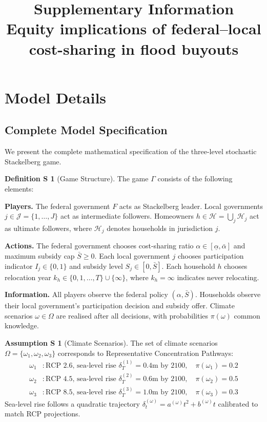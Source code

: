 \documentclass[11pt,letterpaper]{article}
\title{\Large\textbf{Supplementary Information}\\[0.5em]
\large Equity implications of federal--local cost-sharing in flood buyouts}
\author{}
\date{}
\theoremstyle{definition}
\newtheorem{definitionS}{Definition S}
\newtheorem{assumptionS}{Assumption S}
\begin{document}
\maketitle

\tableofcontents
\clearpage

\section{Model Details}

\subsection{Complete Model Specification}

We present the complete mathematical specification of the three-level stochastic Stackelberg game.

\begin{definitionS}[Game Structure]
The game $\Gamma$ consists of the following elements:

\textbf{Players.} The federal government $F$ acts as Stackelberg leader. Local governments $j \in \mathcal{J} = \{1, \ldots, J\}$ act as intermediate followers. Homeowners $h \in \mathcal{H} = \bigcup_{j} \mathcal{H}_j$ act as ultimate followers, where $\mathcal{H}_j$ denotes households in jurisdiction $j$.

\textbf{Actions.} The federal government chooses cost-sharing ratio $\alpha \in [\underline{\alpha}, \bar{\alpha}]$ and maximum subsidy cap $\bar{S} \geq 0$. Each local government $j$ chooses participation indicator $I_j \in \{0, 1\}$ and subsidy level $S_j \in [0, \bar{S}]$. Each household $h$ chooses relocation year $k_h \in \{0, 1, \ldots, T\} \cup \{\infty\}$, where $k_h = \infty$ indicates never relocating.

\textbf{Information.} All players observe the federal policy $(\alpha, \bar{S})$. Households observe their local government's participation decision and subsidy offer. Climate scenarios $\omega \in \Omega$ are realised after all decisions, with probabilities $\pi(\omega)$ common knowledge.
\end{definitionS}

\begin{assumptionS}[Climate Scenarios]\label{ass:climate}
The set of climate scenarios $\Omega = \{\omega_1, \omega_2, \omega_3\}$ corresponds to Representative Concentration Pathways:
\begin{align}
\omega_1 &: \text{RCP 2.6, sea-level rise } \delta_T^{(1)} = 0.4\text{m by 2100}, \quad \pi(\omega_1) = 0.2 \\
\omega_2 &: \text{RCP 4.5, sea-level rise } \delta_T^{(2)} = 0.6\text{m by 2100}, \quad \pi(\omega_2) = 0.5 \\
\omega_3 &: \text{RCP 8.5, sea-level rise } \delta_T^{(3)} = 1.0\text{m by 2100}, \quad \pi(\omega_3) = 0.3
\end{align}
Sea-level rise follows a quadratic trajectory $\delta_t^{(\omega)} = a^{(\omega)} t^2 + b^{(\omega)} t$ calibrated to match RCP projections.
\end{assumptionS}
\end{document}
